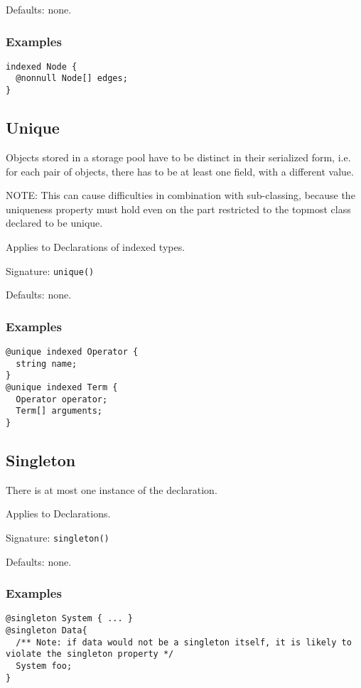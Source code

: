 \documentclass[a4paper,10pt]{article}
\begin{document}
Defaults: none.

\subsubsection*{Examples}
\begin{verbatim}
indexed Node {
  @nonnull Node[] edges;
}
\end{verbatim}


\subsection*{Unique}
Objects stored in a storage pool have to be distinct in their serialized form, i.e. for each pair of objects, there has to be at least one field, with a different value.

NOTE: This can cause difficulties in combination with sub-classing, because the uniqueness property must hold even on the part restricted to the topmost class declared to be unique.

Applies to Declarations of indexed types.

Signature: \verb/unique()/

Defaults: none.

\subsubsection*{Examples}

\begin{verbatim}
@unique indexed Operator {
  string name;
}
@unique indexed Term {
  Operator operator;
  Term[] arguments;
}
\end{verbatim}


\subsection*{Singleton}
There is at most one instance of the declaration.

Applies to Declarations.

Signature: \verb/singleton()/

Defaults: none.

\subsubsection*{Examples}

\begin{verbatim}
@singleton System { ... }
@singleton Data{
  /** Note: if data would not be a singleton itself, it is likely to violate the singleton property */
  System foo;
}
\end{verbatim}
\end{document}
